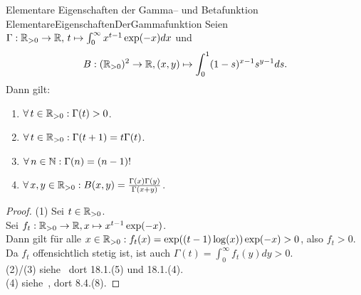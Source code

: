\begin{lemma}{Elementare Eigenschaften der Gamma-- und Betafunktion}
             {ElementareEigenschaftenDerGammafunktion}
Seien $\Gamma:\mathbb{R}_{>0}\rightarrow\mathbb{R},\,
t\mapsto\int_0^\infty x^{t-1}\exp(-x)dx$ und 
\[B: (\mathbb{R}_{>0})^2 \rightarrow \mathbb{R},
(x,y)\mapsto\int_0^1 (1-s)^{x-1}s^{y-1}ds\text.\]
Dann gilt:
\begin{enumerate}[(1)]
	\item \label{ElementareEigenschaftenDerGammafunktion1}
	$\forall\, t \in \mathbb{R}_{>0}: \Gamma(t) > 0$.
	\item \label{ElementareEigenschaftenDerGammafunktion2}
	$\forall\, t \in \mathbb{R}_{>0}: \Gamma(t+1) = t \Gamma(t)$.
	\item\label{ElementareEigenschaftenDerGammafunktion3}
	$\forall\, n \in \mathbb{N}: \Gamma(n) = (n-1)!$
	\item\label{ElementareEigenschaftenDerGammafunktion4}
	$\forall\,x,y\in\mathbb{R}_{>0}: B(x,y) = \frac{\Gamma(x)\Gamma(y)}{\Gamma(x+y)}$.
\end{enumerate}
\end{lemma}
\begin{proof}
(1) Sei $t \in \mathbb{R}_{>0}$.\\
Sei $f_t: \mathbb{R}_{>0} \rightarrow \mathbb{R}, x \mapsto x^{t-1}\exp(-x)$.\\
Dann gilt für alle
$x \in \mathbb{R}_{>0}: f_t(x) = \exp((t-1)\log(x))\exp(-x) > 0$, also $f_t > 0$.\\
Da $f_t$ offensichtlich stetig ist, ist auch
$\Gamma(t)=\int_0^\infty f_t(y)dy > 0$.\\
(2)/(3) siehe~\cite{K1} dort 18.1.(5) und 18.1.(4).\\
(4) siehe~\cite{K2}, dort 8.4.(8).
\end{proof}